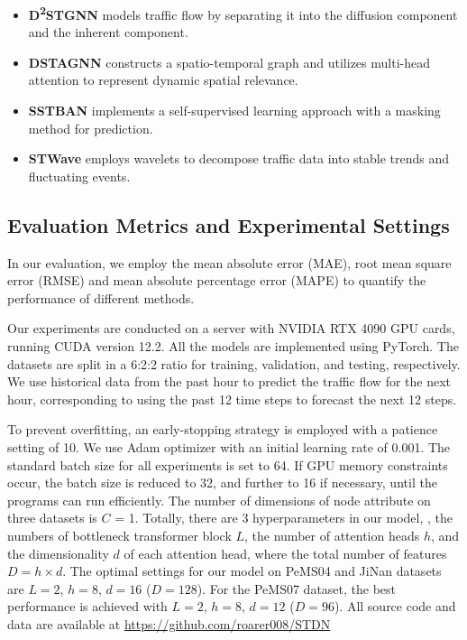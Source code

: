 \begin{itemize}
    \item \textbf{D\textsuperscript{2}}\textbf{STGNN} \cite{D2STGNN} models traffic flow by separating it into the diffusion component and the inherent component.
    \item \textbf{DSTAGNN} \cite{lan2022dstagnn} constructs a spatio-temporal graph and utilizes multi-head attention to represent dynamic spatial relevance.
    \item \textbf{SSTBAN} \cite{guo2023SSTBAN} implements a self-supervised learning approach with a masking method for prediction.
    \item \textbf{STWave} \cite{fang2023STWave} employs wavelets to decompose traffic data into stable trends and fluctuating events.
\end{itemize}

\subsection{Evaluation Metrics and Experimental Settings}
In our evaluation,  we employ the mean absolute error (MAE), root mean square error (RMSE) and mean absolute percentage error (MAPE) to quantify the performance of different methods. 

Our experiments are conducted on a server with NVIDIA RTX 4090 GPU cards, running CUDA version 12.2. All the models are implemented using PyTorch.
The datasets are split in a 6:2:2 ratio for training, validation, and testing, respectively. We use historical data from the past hour to predict the traffic flow for the next hour, corresponding to using the past 12 time steps to forecast the next 12 steps. 


To prevent overfitting, an early-stopping strategy is employed with a patience setting of 10. We use Adam optimizer with an initial learning rate of 0.001. The standard batch size for all experiments is set to 64. If GPU memory constraints occur, the batch size is reduced to 32, and further to 16 if necessary, until the programs can run efficiently. The number of dimensions of node attribute on three datasets is $C$ = 1. Totally, there are 3 hyperparameters in our model, \ie, the numbers of bottleneck transformer block $L$, the number of attention heads $h$, and the dimensionality $d$ of each attention head, where the total number of features $D = h \times d$. The optimal settings for our model  on PeMS04 and JiNan datasets are $L = 2$, $h = 8$, $d = 16$ ($D = 128$). For the PeMS07 dataset, the best performance is achieved with $L = 2$, $h = 8$, $d = 12$ ($D = 96$). All source code and data are available at \url{https://github.com/roarer008/STDN}

